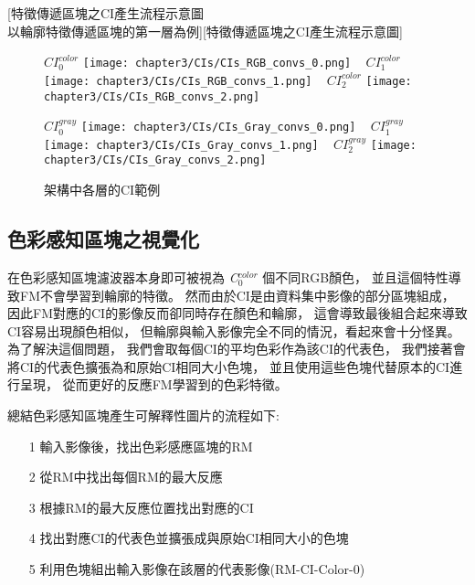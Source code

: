 \documentclass[class=NCU_thesis, crop=false]{standalone}
\begin{document}
	[特徵傳遞區塊之CI產生流程示意圖 \\
	以輪廓特徵傳遞區塊的第一層為例][特徵傳遞區塊之CI產生流程示意圖]

	\begin{figure}[H]
    \centering
    \subcaptionbox
        {$CI^{color}_0$
        \label{fig:CI_color_0}}
        {\texttt{[image: chapter3/CIs/CIs\_RGB\_convs\_0.png]}}
    ~
    \subcaptionbox
        {$CI^{color}_1$
        \label{fig:CI_color_1}}
        {\texttt{[image: chapter3/CIs/CIs\_RGB\_convs\_1.png]}}
    ~
    \subcaptionbox
        {$CI^{color}_2$
        \label{fig:CI_color_2}}
        {\texttt{[image: chapter3/CIs/CIs\_RGB\_convs\_2.png]}}

     \subcaptionbox
        {$CI^{gray}_0$
        \label{fig:CI_gray_0}}
        {\texttt{[image: chapter3/CIs/CIs\_Gray\_convs\_0.png]}}
    ~
    \subcaptionbox
        {$CI^{gray}_1$
        \label{fig:CI_gray_1}}
        {\texttt{[image: chapter3/CIs/CIs\_Gray\_convs\_1.png]}}
    ~
    \subcaptionbox
        {$CI^{gray}_2$
        \label{fig:CI_gray_2}}
        {\texttt{[image: chapter3/CIs/CIs\_Gray\_convs\_2.png]}}
    \caption{架構中各層的CI範例}
    \label{fig:CIs}
	\end{figure}

	\pagebreak
	\subsection{色彩感知區塊之視覺化}
	在色彩感知區塊濾波器本身即可被視為 \textit{C}$^{color}_{0}$ 個不同RGB顏色，
	並且這個特性導致FM不會學習到輪廓的特徵。
	然而由於CI是由資料集中影像的部分區塊組成，
	因此FM對應的CI的影像反而卻同時存在顏色和輪廓，
	這會導致最後組合起來導致CI容易出現顏色相似，
	但輪廓與輸入影像完全不同的情況，看起來會十分怪異。
	為了解決這個問題，
	我們會取每個CI的平均色彩作為該CI的代表色，
	我們接著會將CI的代表色擴張為和原始CI相同大小色塊，
	並且使用這些色塊代替原本的CI進行呈現，
	從而更好的反應FM學習到的色彩特徵。

	總結色彩感知區塊產生可解釋性圖片的流程如下:
	\begin{itemize}
		\item [1]
		輸入影像後，找出色彩感應區塊的RM
		\item [2]
		從RM中找出每個RM的最大反應
		\item [3]
		根據RM的最大反應位置找出對應的CI
		\item [4]
		找出對應CI的代表色並擴張成與原始CI相同大小的色塊
		\item [5]
		利用色塊組出輸入影像在該層的代表影像(RM-CI-Color-0)
	\end{itemize}
\end{document}
